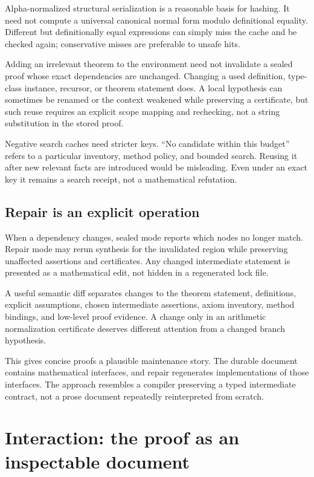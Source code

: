 \documentclass[11pt,a4paper]{article}
\theoremstyle{remark}
\begin{document}
Alpha-normalized structural serialization is a reasonable basis for hashing. It need not compute a universal canonical normal form modulo definitional equality. Different but definitionally equal expressions can simply miss the cache and be checked again; conservative misses are preferable to unsafe hits.

Adding an irrelevant theorem to the environment need not invalidate a sealed proof whose exact dependencies are unchanged. Changing a used definition, type-class instance, recursor, or theorem statement does. A local hypothesis can sometimes be renamed or the context weakened while preserving a certificate, but such reuse requires an explicit scope mapping and rechecking, not a string substitution in the stored proof.

Negative search caches need stricter keys. ``No candidate within this budget'' refers to a particular inventory, method policy, and bounded search. Reusing it after new relevant facts are introduced would be misleading. Even under an exact key it remains a search receipt, not a mathematical refutation.

\subsection{Repair is an explicit operation}
When a dependency changes, sealed mode reports which nodes no longer match. Repair mode may rerun synthesis for the invalidated region while preserving unaffected assertions and certificates. Any changed intermediate statement is presented as a mathematical edit, not hidden in a regenerated lock file.

A useful semantic diff separates changes to the theorem statement, definitions, explicit assumptions, chosen intermediate assertions, axiom inventory, method bindings, and low-level proof evidence. A change only in an arithmetic normalization certificate deserves different attention from a changed branch hypothesis.

This gives concise proofs a plausible maintenance story. The durable document contains mathematical interfaces, and repair regenerates implementations of those interfaces. The approach resembles a compiler preserving a typed intermediate contract, not a prose document repeatedly reinterpreted from scratch.

\section{Interaction: the proof as an inspectable document}\label{sec:interaction}
\end{document}
